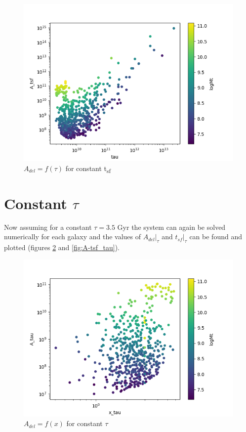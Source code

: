 \documentclass[a4paper,twocolumn]{article}
\begin{document}
\begin{figure}[!htpb]
\centering
\includegraphics[width=.9\linewidth]{./figs/T-A_tsf.png}
\caption{\label{fig:A-tau_tsf}\(A_{del} = f(\tau)\) for constant t\textsubscript{sf}}
\end{figure}

\section{Constant \(\tau\)}
\label{sec:org8d5bda4}

Now assuming for a constant \(\tau = 3.5\) Gyr the system can again be solved numerically for each galaxy and the values of \(A_{del}|_{\tau}\) and \(t_{sf}|_{\tau}\) can be found and plotted (figures \ref{fig:A-x_tau} and \ref{fig:A-tsf_tau}).

\begin{figure}[!htpb]
\centering
\includegraphics[width=.9\linewidth]{./figs/x-A_tau.png}
\caption{\label{fig:A-x_tau}\(A_{del} = f(x)\) for constant \(\tau\)}
\end{figure}
\end{document}
